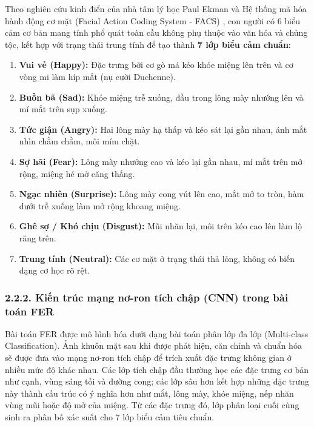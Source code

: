 Theo nghiên cứu kinh điển của nhà tâm lý học Paul Ekman và Hệ thống mã hóa hành động cơ mặt (Facial Action Coding System - FACS) \cite{facs}, con người có 6 biểu cảm cơ bản mang tính phổ quát toàn cầu không phụ thuộc vào văn hóa và chủng tộc, kết hợp với trạng thái trung tính để tạo thành \textbf{7 lớp biểu cảm chuẩn}:
\begin{enumerate}
    \item \textbf{Vui vẻ (Happy):} Đặc trưng bởi cơ gò má kéo khóe miệng lên trên và cơ vòng mi làm híp mắt (nụ cười Duchenne).
    \item \textbf{Buồn bã (Sad):} Khóe miệng trễ xuống, đầu trong lông mày nhướng lên và mí mắt trên sụp xuống.
    \item \textbf{Tức giận (Angry):} Hai lông mày hạ thấp và kéo sát lại gần nhau, ánh mắt nhìn chằm chằm, môi mím chặt.
    \item \textbf{Sợ hãi (Fear):} Lông mày nhướng cao và kéo lại gần nhau, mí mắt trên mở rộng, miệng hé mở căng thẳng.
    \item \textbf{Ngạc nhiên (Surprise):} Lông mày cong vút lên cao, mắt mở to tròn, hàm dưới trễ xuống làm mở rộng khoang miệng.
    \item \textbf{Ghê sợ / Khó chịu (Disgust):} Mũi nhăn lại, môi trên kéo cao lên làm lộ răng trên.
    \item \textbf{Trung tính (Neutral):} Các cơ mặt ở trạng thái thả lỏng, không có biến dạng cơ học rõ rệt.
\end{enumerate}

\subsubsection*{2.2.2. Kiến trúc mạng nơ-ron tích chập (CNN) trong bài toán FER}

Bài toán FER được mô hình hóa dưới dạng bài toán phân lớp đa lớp (Multi-class Classification). Ảnh khuôn mặt sau khi được phát hiện, căn chỉnh và chuẩn hóa sẽ được đưa vào mạng nơ-ron tích chập để trích xuất đặc trưng không gian ở nhiều mức độ khác nhau. Các lớp tích chập đầu thường học các đặc trưng cơ bản như cạnh, vùng sáng tối và đường cong; các lớp sâu hơn kết hợp những đặc trưng này thành cấu trúc có ý nghĩa hơn như mắt, lông mày, khóe miệng, nếp nhăn vùng mũi hoặc độ mở của miệng. Từ các đặc trưng đó, lớp phân loại cuối cùng sinh ra phân bố xác suất cho 7 lớp biểu cảm tiêu chuẩn.


